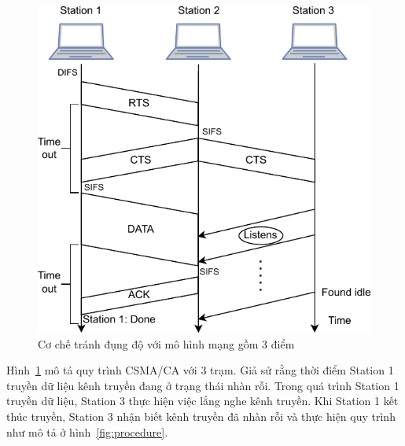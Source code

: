 \begin{figure}[h]
    \centering
    \includegraphics[width=0.7\linewidth]{figures/Chapter2/csma_ca scheme_k2opt.pdf}
    \caption{Cơ chế tránh đụng độ với mô hình mạng gồm 3 điểm}
    \label{fig:csmaca}
\end{figure}

Hình~\ref{fig:csmaca} mô tả quy trình CSMA/CA với 3 trạm. Giả sử rằng thời điểm Station 1 truyền dữ liệu kênh truyền đang ở trạng thái nhàn rỗi.
Trong quá trình Station 1 truyền dữ liệu, Station 3 thực hiện việc lắng nghe kênh truyền. Khi Station 1 kết thúc truyền, Station 3 nhận biết kênh truyền 
đã nhàn rỗi và thực hiện quy trình như mô tả ở hình~\ref{fig:procedure}.